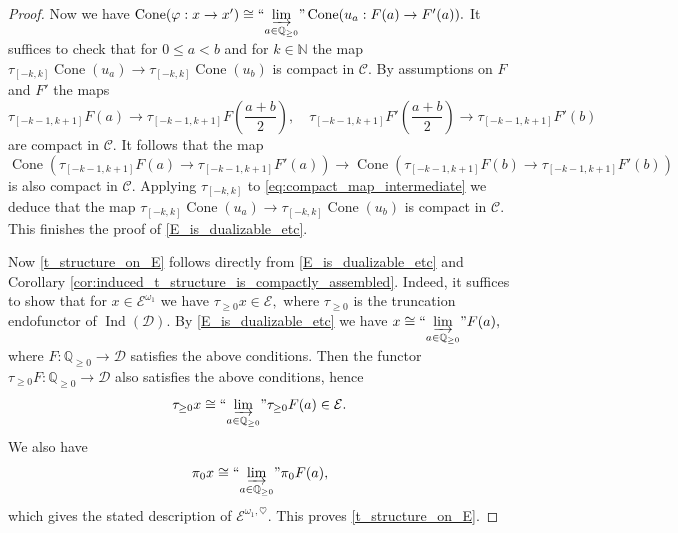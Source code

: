 \documentclass[11pt,leqno]{amsart}
\numberwithin{equation}{section}
\def\N{\mathbb{N}}
\def\Q{\mathbb{Q}}
\newcommand{\indlim}[1][]{\mathop{\varinjlim}\limits_{#1}}
\newcommand{\inddlim}[1][]{{``{\indlim[#1]}"}}
\newcommand{\Cone}{\operatorname{Cone}}
\newcommand{\cD}{{\mathcal D}}
\newcommand{\cC}{{\mathcal C}}
\newcommand{\cE}{{\mathcal E}}
\newcommand{\Ind}{\operatorname{Ind}}
\begin{document}
\begin{proof}
Now we have $\Cone(\varphi:x\to x')\cong\inddlim[a\in\Q_{\geq 0}]\Cone(u_a:F(a)\to F'(a)).$ It suffices to check that for $0\leq a<b$ and for $k\in\N$ the map $\tau_{[-k,k]}\Cone(u_a)\to\tau_{[-k,k]}\Cone(u_b)$ is compact in $\cC.$ By assumptions on $F$ and $F'$ the maps
\begin{equation*}
\tau_{[-k-1,k+1]}F(a)\to \tau_{[-k-1,k+1]}F\left(\frac{a+b}{2}\right),\quad \tau_{[-k-1,k+1]}F'\left(\frac{a+b}{2}\right)\to \tau_{[-k-1,k+1]}F'(b)
\end{equation*}
are compact in $\cC.$ It follows that the map
\begin{equation}\label{eq:compact_map_intermediate}
\Cone(\tau_{[-k-1,k+1]}F(a)\to \tau_{[-k-1,k+1]}F'(a))\to \Cone(\tau_{[-k-1,k+1]}F(b)\to \tau_{[-k-1,k+1]}F'(b))
\end{equation}
is also compact in $\cC.$ Applying $\tau_{[-k,k]}$ to \eqref{eq:compact_map_intermediate} we deduce that the map $\tau_{[-k,k]}\Cone(u_a)\to \tau_{[-k,k]}\Cone(u_b)$ is compact in $\cC.$ This finishes the proof of \ref{E_is_dualizable_etc}.

Now \ref{t_structure_on_E} follows directly from \ref{E_is_dualizable_etc} and Corollary \ref{cor:induced_t_structure_is_compactly_assembled}. Indeed, it suffices to show that for $x\in\cE^{\omega_1}$ we have $\tau_{\geq 0}x\in\cE,$ where $\tau_{\geq 0}$ is the truncation endofunctor of $\Ind(\cD).$ By \ref{E_is_dualizable_etc} we have $x\cong\inddlim[a\in\Q_{\geq 0}]F(a),$ where $F:\Q_{\geq 0}\to \cD$ satisfies the above conditions. Then the functor $\tau_{\geq 0}F:\Q_{\geq 0}\to\cD$ also satisfies the above conditions, hence
\begin{equation*}
\tau_{\geq 0}x\cong \inddlim[a\in\Q_{\geq 0}]\tau_{\geq 0}F(a)\in\cE.
\end{equation*}
We also have
\begin{equation*}
\pi_0 x\cong \inddlim[a\in \Q_{\geq 0}]\pi_0 F(a),
\end{equation*}
which gives the stated description of $\cE^{\omega_1,\heartsuit}.$ This proves \ref{t_structure_on_E}.


\end{proof}
\end{document}
